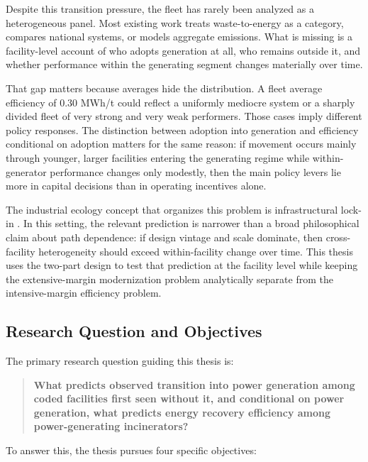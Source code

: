 \documentclass[12pt,a4paper]{article}
\begin{document}
Despite this transition pressure, the fleet has rarely been analyzed as a heterogeneous panel. Most existing work treats waste-to-energy as a category, compares national systems, or models aggregate emissions. What is missing is a facility-level account of who adopts generation at all, who remains outside it, and whether performance within the generating segment changes materially over time.

That gap matters because averages hide the distribution. A fleet average efficiency of 0.30 MWh/t could reflect a uniformly mediocre system or a sharply divided fleet of very strong and very weak performers. Those cases imply different policy responses. The distinction between adoption into generation and efficiency conditional on adoption matters for the same reason: if movement occurs mainly through younger, larger facilities entering the generating regime while within-generator performance changes only modestly, then the main policy levers lie more in capital decisions than in operating incentives alone.

The industrial ecology concept that organizes this problem is infrastructural lock-in \citep{Unruh2000, Seto2016}. In this setting, the relevant prediction is narrower than a broad philosophical claim about path dependence: if design vintage and scale dominate, then cross-facility heterogeneity should exceed within-facility change over time. This thesis uses the two-part design to test that prediction at the facility level while keeping the extensive-margin modernization problem analytically separate from the intensive-margin efficiency problem.

\subsection{Research Question and Objectives}

The primary research question guiding this thesis is:

\begin{quote}
\textbf{What predicts observed transition into power generation among coded facilities first seen without it, and conditional on power generation, what predicts energy recovery efficiency among power-generating incinerators?}
\end{quote}

To answer this, the thesis pursues four specific objectives:
\end{document}
